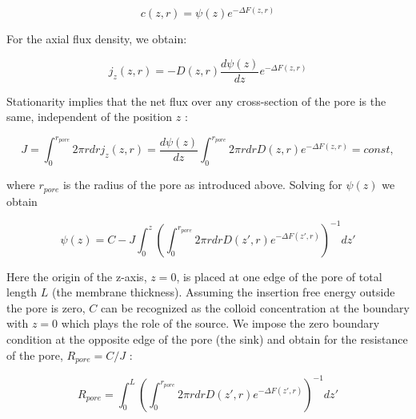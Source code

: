 \documentclass[12pt, a4paper]{article}
\begin{document}
\begin{equation}
c(z,r)=\psi(z)e^{-\Delta F(z,r)}\label{eq:stationary_c_ansatz}
\end{equation}

For the axial flux density, we obtain:

\begin{equation}
j_{z}(z,r)=-D(z,r)\frac{d\psi(z)}{dz}e^{-\Delta F(z,r)}\label{eq:flux_ansatz}
\end{equation}

\noindent 
Stationarity implies that the net flux over any cross-section of the pore is the same, independent of the position  $z$ :

\begin{equation}
J=\int_{0}^{r_{pore}}2\pi rdrj_{z}(z,r)=\frac{d\psi(z)}{dz}\int_{0}^{r_{pore}}2\pi rdrD(z,r)e^{-\Delta F(z,r)}=const,\label{eq:fi_const}
\end{equation}

\noindent where $r_{pore}$ is the radius of the pore as introduced above. Solving for $\psi(z)$  we obtain 

\begin{equation}
\psi(z)=C-J\int_{0}^{z}\left(\int_{0}^{r_{pore}}2\pi rdrD(z',r)e^{-\Delta F(z',r)}\right)^{-1}dz'\label{eq:psi}
\end{equation}


\noindent Here the origin of the z-axis,  $z=0$, is placed at one edge of the pore  of total length $L$ (the membrane thickness). 
Assuming the insertion free energy outside the pore is zero, $C$  can be recognized as the colloid concentration at the boundary with $z=0$ 
which plays the role of the source.   We impose the zero boundary condition at the opposite edge of the pore 
(the sink) and obtain for the resistance of the pore, $R_{pore}=C/J$ : 


\begin{equation}
R_{pore}=\int_{0}^{L}\left(\int_{0}^{r_{pore}}2\pi rdrD(z',r)e^{-\Delta F(z',r)}\right)^{-1}dz'\label{eq:res_with_brush}
\end{equation}
\end{document}
